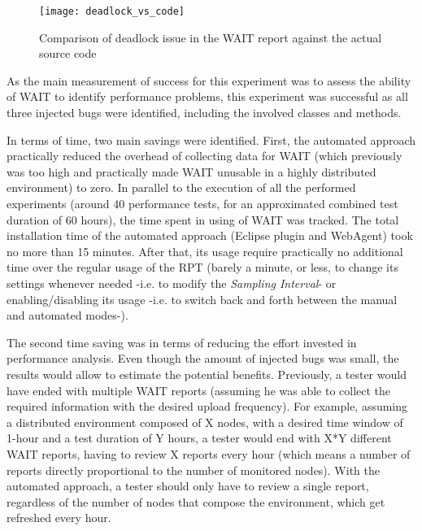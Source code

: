 \documentclass[runningheads,a4paper]{llncs}
\begin{document}
\begin{figure}[!h]
\texttt{[image: deadlock\_vs\_code]}
\caption{Comparison of deadlock issue in the WAIT report against the
actual source code}
\label{fig_dlissue_vs_code}
\end{figure}

As the main measurement of success for this experiment was to assess the
ability of WAIT to identify performance problems, this experiment was
successful as all three injected bugs were identified, including the
involved classes and methods. 

In terms of time, two main savings were identified. First, the automated
approach practically reduced the overhead of collecting data for WAIT (which
previously was too high and practically made WAIT unusable in a highly
distributed environment) to zero. In parallel to the execution of all the performed 
experiments (around 40 performance tests, for an approximated combined test
duration of 60 hours), the time spent in using of WAIT was tracked. The total 
installation time of the automated approach (Eclipse plugin and WebAgent) took
no more than 15 minutes. After that, its usage require practically no additional time over the regular usage of the
RPT (barely a minute, or less, to change its settings whenever needed -i.e. to
modify the \emph{Sampling Interval}- or enabling/disabling its usage -i.e. to
switch back and forth between the manual and automated modes-).

The second time saving was in terms of reducing the effort invested
in performance analysis. Even though the amount of injected bugs was
small, the results would allow to estimate the potential benefits. Previously, 
a tester would have ended with multiple WAIT reports (assuming he was able to
collect the required information with the desired upload frequency). For
example, assuming a distributed environment composed of X nodes, with a desired
time window of 1-hour and a test duration of Y hours, a tester would end with X*Y 
different WAIT reports, having to review X reports every hour (which means a
number of reports directly proportional to the number of monitored nodes). With
the automated approach, a tester should only have to review a single report,
regardless of the number of nodes that compose the environment, which get refreshed 
every hour.
\end{document}
